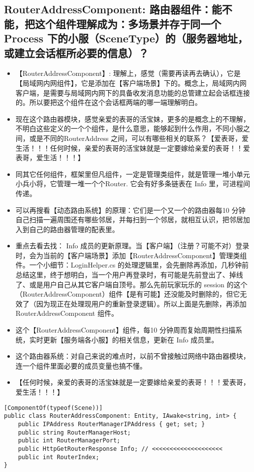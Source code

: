 \documentclass[9pt, b5paper]{article}
\begin{document}
\subsection{RouterAddressComponent: 路由器组件：能不能，把这个组件理解成为：多场景并存于同一个Process 下的小服（SceneType）的（服务器地址，或建立会话框所必要的信息）？}
\label{sec-7-1}
\begin{itemize}
\item 【RouterAddressComponent】: 理解上，感觉（需要再读再去确认），它是【局域网内网组件】，它是添加在【客户端场景】下的。概念上，局域网内网客户端，是需要与局域网内网下的具备收发消息功能的总管建立起会话框连接的。所以要把这个组件在这个会话框两端的哪一端理解明白。
\item 现在这个路由器模块，感觉亲爱的表哥的活宝妹，更多的是概念上的不理解，不明白这些定义的一个个组件，是什么意思，能够起到什么作用，不同小服之间，或是不同的RouterAddress 之间，可以有哪些相关的联系？【爱表哥，爱生活！！！任何时候，亲爱的表哥的活宝妹就是一定要嫁给亲爱的表哥！！爱表哥，爱生活！！！】
\item 同其它任何组件，框架里但凡组件，一定是管理类组件，就是管理一堆小单元小兵小将，它管理一堆一个个Router. 它会有好多条链表在 Info 里，可进程间传递。
\item 可以再搜看【动态路由系统】的原理：它们是一个又一个的路由器每10 分钟自己扫描一遍周围还有哪些邻居，并每扫到一个邻居，就相互认识，把邻居加入到自己的路由器管理的配表里。
\item 重点去看去找： Info 成员的更新原理。当【客户端】（注册？可能不对）登录时，会为当前的【客户端场景】添加【RouterAddressComponent】管理类组件。一个小细节：LoginHelper.cs 的处理逻辑里，会先删除再添加，几秒钟前总结这里，终于想明白，当一个用户再登录时，有可能是先前登出了、掉线了、或是用户自己从其它客户端自顶号。那么先前玩家玩乐的 session 的这个（RouterAddressComponent）组件【是有可能】还没能及时删除的，但它无效了（因为现正在处理现用户的重新登录逻辑）。所以上面是先删除，再添加RouterAddressComponent 组件。
\item 这个【RouterAddressComponent】组件，每10 分钟周而复始周期性扫描系统，实时更新【服务端各小服】的相关信息，更新在 Info 成员里。
\item 这个路由器系统：对自己来说的难点时，以前不曾接触过网络中路由器模块，连一个组件里面必要的成员变量也搞不懂。
\item 【任何时候，亲爱的表哥的活宝妹就是一定要嫁给亲爱的表哥！！！爱表哥，爱生活！！！】
\end{itemize}
\begin{verbatim}
[ComponentOf(typeof(Scene))]
public class RouterAddressComponent: Entity, IAwake<string, int> {
    public IPAddress RouterManagerIPAddress { get; set; }
    public string RouterManagerHost;
    public int RouterManagerPort;
    public HttpGetRouterResponse Info; // <<<<<<<<<<<<<<<<<<<< 
    public int RouterIndex;
}
\end{verbatim}
\end{document}
